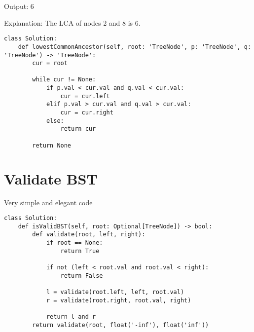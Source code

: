 \documentclass[24pt, a4]{article}
\begin{document}
Output: 6

Explanation: The LCA of nodes 2 and 8 is 6.
\begin{lstlisting}
class Solution:
    def lowestCommonAncestor(self, root: 'TreeNode', p: 'TreeNode', q: 'TreeNode') -> 'TreeNode':
        cur = root
        
        while cur != None:
            if p.val < cur.val and q.val < cur.val:
                cur = cur.left
            elif p.val > cur.val and q.val > cur.val:
                cur = cur.right
            else:
                return cur
        
        return None
\end{lstlisting}
\section{Validate BST}
Very simple and elegant code
\begin{lstlisting}
class Solution:
    def isValidBST(self, root: Optional[TreeNode]) -> bool:
        def validate(root, left, right):
            if root == None:
                return True
            
            if not (left < root.val and root.val < right):
                return False
            
            l = validate(root.left, left, root.val) 
            r = validate(root.right, root.val, right)
            
            return l and r
        return validate(root, float('-inf'), float('inf'))
\end{lstlisting}
\end{document}
